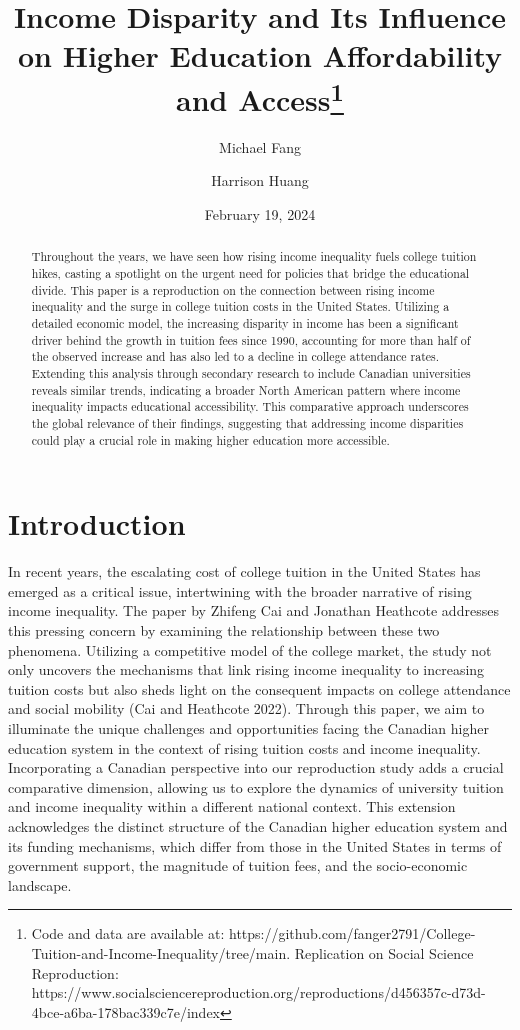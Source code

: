 \documentclass[
  letterpaper,
  DIV=11,
  numbers=noendperiod]{scrartcl}
\title{Income Disparity and Its Influence on Higher Education
Affordability and Access\thanks{Code and data are available at:
https://github.com/fanger2791/College-Tuition-and-Income-Inequality/tree/main.
Replication on Social Science Reproduction:
https://www.socialsciencereproduction.org/reproductions/d456357c-d73d-4bce-a6ba-178bac339c7e/index}}
\author{Michael Fang \and Harrison Huang}
\date{February 19, 2024}
\begin{document}
\maketitle
\begin{abstract}
Throughout the years, we have seen how rising income inequality fuels
college tuition hikes, casting a spotlight on the urgent need for
policies that bridge the educational divide. This paper is a
reproduction on the connection between rising income inequality and the
surge in college tuition costs in the United States. Utilizing a
detailed economic model, the increasing disparity in income has been a
significant driver behind the growth in tuition fees since 1990,
accounting for more than half of the observed increase and has also led
to a decline in college attendance rates. Extending this analysis
through secondary research to include Canadian universities reveals
similar trends, indicating a broader North American pattern where income
inequality impacts educational accessibility. This comparative approach
underscores the global relevance of their findings, suggesting that
addressing income disparities could play a crucial role in making higher
education more accessible.
\end{abstract}

\section{Introduction}\label{introduction}

In recent years, the escalating cost of college tuition in the United
States has emerged as a critical issue, intertwining with the broader
narrative of rising income inequality. The paper by Zhifeng Cai and
Jonathan Heathcote addresses this pressing concern by examining the
relationship between these two phenomena. Utilizing a competitive model
of the college market, the study not only uncovers the mechanisms that
link rising income inequality to increasing tuition costs but also sheds
light on the consequent impacts on college attendance and social
mobility (Cai and Heathcote 2022). Through this paper, we aim to
illuminate the unique challenges and opportunities facing the Canadian
higher education system in the context of rising tuition costs and
income inequality. Incorporating a Canadian perspective into our
reproduction study adds a crucial comparative dimension, allowing us to
explore the dynamics of university tuition and income inequality within
a different national context. This extension acknowledges the distinct
structure of the Canadian higher education system and its funding
mechanisms, which differ from those in the United States in terms of
government support, the magnitude of tuition fees, and the
socio-economic landscape.
\end{document}
